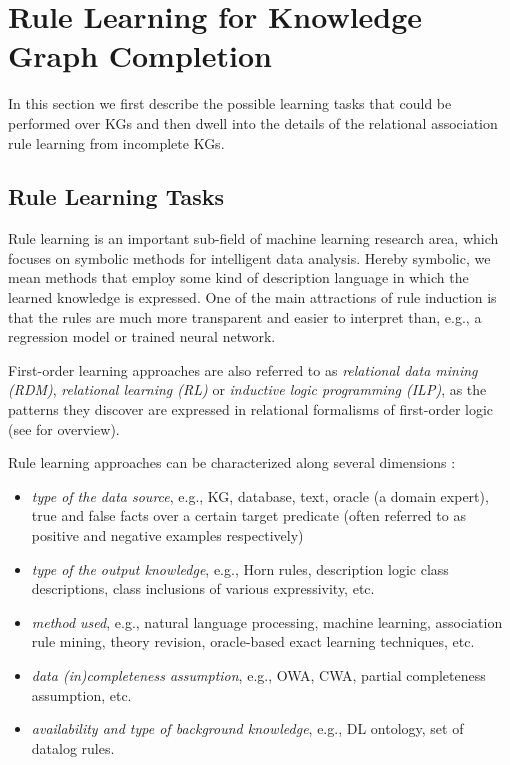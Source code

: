 \section{ Rule Learning for Knowledge Graph Completion}
\label{sec:rules_kg_completion}
In this section we first describe the possible learning tasks that could be performed over KGs and then dwell into the details of the relational association rule learning from incomplete KGs. 
\subsection{Rule Learning Tasks}
\label{sec:rules_learning_tasks}
Rule learning is an important sub-field of machine learning research area, which focuses on symbolic methods for intelligent data analysis. Hereby symbolic, we mean methods that employ some kind of description language in which the learned knowledge is expressed. One of the main attractions of rule induction is that the rules are much more transparent and easier to interpret than, e.g., a regression model or trained neural network.

First-order learning approaches are also referred to as \emph{relational data mining (RDM)}, \emph{relational learning
(RL)} or \emph{inductive logic programming (ILP)}, as the patterns they discover are expressed in
relational formalisms of first-order logic (see \cite{DBLP:books/daglib/0021868} for overview).

Rule learning approaches can be characterized along several dimensions \cite{DBLP:conf/semweb/SazonauS17}: 
\begin{itemize}
\item \emph{type of the data source}, e.g., KG, database, text, oracle (a domain expert), true and false facts over a certain target predicate (often referred to as positive and negative examples respectively)
\item \emph{type of the output knowledge}, e.g., Horn rules, description logic class descriptions, class inclusions of various expressivity, etc.
\item \emph{method used}, e.g., natural language processing, machine learning, association rule mining, theory revision, oracle-based exact learning techniques, etc.
\item \emph{data (in)completeness assumption}, e.g., OWA, CWA, partial completeness assumption, etc.
\item \emph{availability and type of background knowledge}, e.g., DL ontology, set of datalog rules.
\end{itemize}

